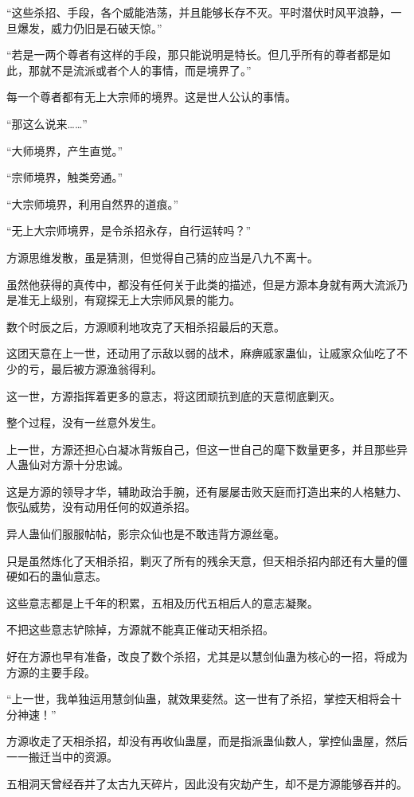 \begin{this_body}
“这些杀招、手段，各个威能浩荡，并且能够长存不灭。平时潜伏时风平浪静，一旦爆发，威力仍旧是石破天惊。”

“若是一两个尊者有这样的手段，那只能说明是特长。但几乎所有的尊者都是如此，那就不是流派或者个人的事情，而是境界了。”

每一个尊者都有无上大宗师的境界。这是世人公认的事情。

“那这么说来……”

“大师境界，产生直觉。”

“宗师境界，触类旁通。”

“大宗师境界，利用自然界的道痕。”

“无上大宗师境界，是令杀招永存，自行运转吗？”

方源思维发散，虽是猜测，但觉得自己猜的应当是八九不离十。

虽然他获得的真传中，都没有任何关于此类的描述，但是方源本身就有两大流派乃是准无上级别，有窥探无上大宗师风景的能力。

数个时辰之后，方源顺利地攻克了天相杀招最后的天意。

这团天意在上一世，还动用了示敌以弱的战术，麻痹戚家蛊仙，让戚家众仙吃了不少的亏，最后被方源渔翁得利。

这一世，方源指挥着更多的意志，将这团顽抗到底的天意彻底剿灭。

整个过程，没有一丝意外发生。

上一世，方源还担心白凝冰背叛自己，但这一世自己的麾下数量更多，并且那些异人蛊仙对方源十分忠诚。

这是方源的领导才华，辅助政治手腕，还有屡屡击败天庭而打造出来的人格魅力、恢弘威势，没有动用任何的奴道杀招。

异人蛊仙们服服帖帖，影宗众仙也是不敢违背方源丝毫。

只是虽然炼化了天相杀招，剿灭了所有的残余天意，但天相杀招内部还有大量的僵硬如石的蛊仙意志。

这些意志都是上千年的积累，五相及历代五相后人的意志凝聚。

不把这些意志铲除掉，方源就不能真正催动天相杀招。

好在方源也早有准备，改良了数个杀招，尤其是以慧剑仙蛊为核心的一招，将成为方源的主要手段。

“上一世，我单独运用慧剑仙蛊，就效果斐然。这一世有了杀招，掌控天相将会十分神速！”

方源收走了天相杀招，却没有再收仙蛊屋，而是指派蛊仙数人，掌控仙蛊屋，然后一一搬迁当中的资源。

五相洞天曾经吞并了太古九天碎片，因此没有灾劫产生，却不是方源能够吞并的。


\end{this_body}

